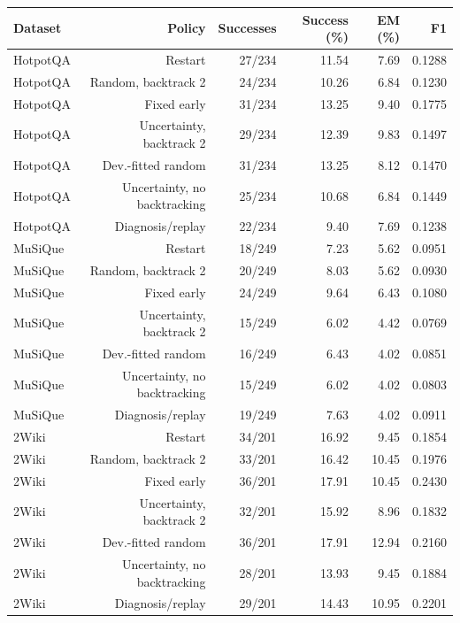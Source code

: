 \begin{tabular}{@{}lrrrrr@{}}
\toprule
Dataset & Policy & Successes & Success (\%) & EM (\%) & F1 \\
\midrule
HotpotQA & Restart & 27/234 & 11.54 & 7.69 & 0.1288 \\
HotpotQA & Random, backtrack 2 & 24/234 & 10.26 & 6.84 & 0.1230 \\
HotpotQA & Fixed early & 31/234 & 13.25 & 9.40 & 0.1775 \\
HotpotQA & Uncertainty, backtrack 2 & 29/234 & 12.39 & 9.83 & 0.1497 \\
HotpotQA & Dev.-fitted random & 31/234 & 13.25 & 8.12 & 0.1470 \\
HotpotQA & Uncertainty, no backtracking & 25/234 & 10.68 & 6.84 & 0.1449 \\
HotpotQA & Diagnosis/replay & 22/234 & 9.40 & 7.69 & 0.1238 \\
MuSiQue & Restart & 18/249 & 7.23 & 5.62 & 0.0951 \\
MuSiQue & Random, backtrack 2 & 20/249 & 8.03 & 5.62 & 0.0930 \\
MuSiQue & Fixed early & 24/249 & 9.64 & 6.43 & 0.1080 \\
MuSiQue & Uncertainty, backtrack 2 & 15/249 & 6.02 & 4.42 & 0.0769 \\
MuSiQue & Dev.-fitted random & 16/249 & 6.43 & 4.02 & 0.0851 \\
MuSiQue & Uncertainty, no backtracking & 15/249 & 6.02 & 4.02 & 0.0803 \\
MuSiQue & Diagnosis/replay & 19/249 & 7.63 & 4.02 & 0.0911 \\
2Wiki & Restart & 34/201 & 16.92 & 9.45 & 0.1854 \\
2Wiki & Random, backtrack 2 & 33/201 & 16.42 & 10.45 & 0.1976 \\
2Wiki & Fixed early & 36/201 & 17.91 & 10.45 & 0.2430 \\
2Wiki & Uncertainty, backtrack 2 & 32/201 & 15.92 & 8.96 & 0.1832 \\
2Wiki & Dev.-fitted random & 36/201 & 17.91 & 12.94 & 0.2160 \\
2Wiki & Uncertainty, no backtracking & 28/201 & 13.93 & 9.45 & 0.1884 \\
2Wiki & Diagnosis/replay & 29/201 & 14.43 & 10.95 & 0.2201 \\
\bottomrule
\end{tabular}
